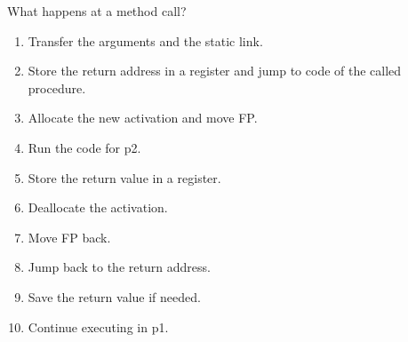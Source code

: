 \documentclass[11pt]{beamer}
\begin{document}
\begin{frame}
\begin{block}{What happens at a method call? }
\begin{enumerate}
\item Transfer the arguments and the static link.
\item Store the return address in a register and jump to code of the called procedure. 
\item Allocate the new activation and move FP. 
\item Run the code for p2. 
\item Store the return value in a register.
\item Deallocate the activation.
\item Move FP back.
\item Jump back to the return address. 
\item Save the return value if needed.
\item Continue executing in p1. 

\end{enumerate}
\end{block}


\end{frame}
\end{document}

